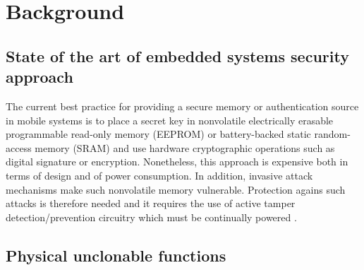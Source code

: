 \chapter{Background}

\section{State of the art of embedded systems security approach}

The current best practice for providing a secure memory or authentication source in mobile systems is to place a secret key in nonvolatile electrically erasable programmable read-only memory (EEPROM) or battery-backed static random-access memory (SRAM) and use hardware cryptographic operations such as digital signature or encryption. Nonetheless, this approach is expensive both in terms of design and of power consumption. In addition, invasive attack mechanisms make such nonvolatile memory vulnerable. Protection agains such attacks is therefore needed and it requires the use of active tamper detection/prevention circuitry which must be continually powered \cite{PUF_IEEE_Herder}.

\section{Physical unclonable functions}

